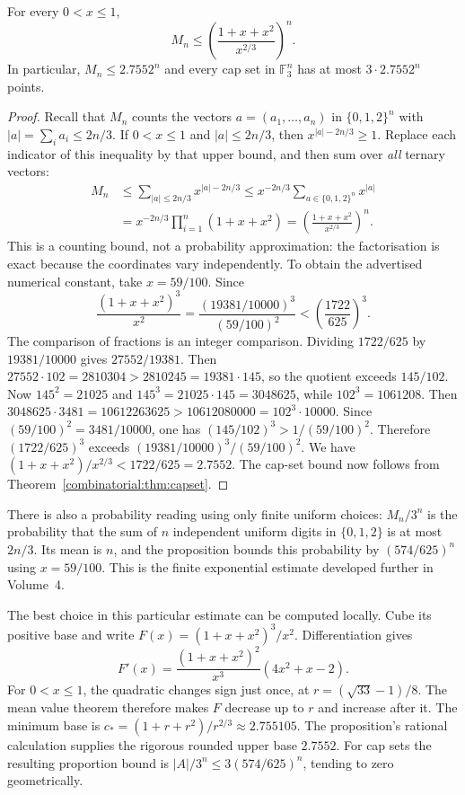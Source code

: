 \begin{proposition}\label{combinatorial:prop:mn}
For every $0<x\le1$,
\[
M_n\le\left(\frac{1+x+x^2}{x^{2/3}}\right)^n.
\]
In particular, $M_n\le 2.7552^n$ and every cap set in
$\mathbb F_3^n$ has at most $3\cdot2.7552^n$ points.
\end{proposition}
\begin{proof}
Recall that $M_n$ counts the vectors $a=(a_1,\ldots,a_n)$
in $\{0,1,2\}^n$ with $|a|=\sum_i a_i\le 2n/3$.
If $0<x\le1$ and $|a|\le2n/3$, then
$x^{|a|-2n/3}\ge1$. Replace each indicator of this
inequality by that upper bound, and then sum over
\emph{all} ternary vectors:
\[
\begin{aligned}
M_n
&\le\sum_{|a|\le2n/3}x^{|a|-2n/3}
 \le x^{-2n/3}\sum_{a\in\{0,1,2\}^n}x^{|a|}\\
&=x^{-2n/3}\prod_{i=1}^n(1+x+x^2)
 =\left(\frac{1+x+x^2}{x^{2/3}}\right)^n.
\end{aligned}
\]
This is a counting bound, not a probability approximation:
the factorisation is exact because the coordinates vary
independently. To obtain the advertised numerical constant,
take $x=59/100$. Since
\[
\frac{(1+x+x^2)^3}{x^2}
=\frac{(19381/10000)^3}{(59/100)^2}
<\left(\frac{1722}{625}\right)^3.
\]
The comparison of fractions is an integer comparison. Dividing $1722/625$ by $19381/10000$ gives $27552/19381$. Then $27552\cdot102=2810304>2810245=19381\cdot145$, so the quotient exceeds $145/102$. Now $145^2=21025$ and $145^3=21025\cdot145=3048625$, while $102^3=1061208$. Then $3048625\cdot3481=10612263625>10612080000=102^3\cdot10000$. Since $(59/100)^2=3481/10000$, one has $(145/102)^3>1/(59/100)^2$. Therefore $(1722/625)^3$ exceeds $(19381/10000)^3/(59/100)^2$.
We have $(1+x+x^2)/x^{2/3}<1722/625=2.7552$.
The cap-set bound now follows from
Theorem~\ref{combinatorial:thm:capset}.
\end{proof}

There is also a probability reading using only finite uniform choices:
$M_n/3^n$ is the probability that the sum of $n$ independent uniform digits
in $\{0,1,2\}$ is at most $2n/3$. Its mean is $n$, and the proposition
bounds this probability by $(574/625)^n$ using $x=59/100$.
This is the finite exponential estimate developed further in Volume~4.

The best choice in this particular estimate can be computed locally.
Cube its positive base and write $F(x)=(1+x+x^2)^3/x^2$. Differentiation gives
\[
F'(x)=\frac{(1+x+x^2)^2}{x^3}(4x^2+x-2).
\]
For $0<x\le1$, the quadratic changes sign just once, at
$r=(\sqrt{33}-1)/8$. The mean value theorem therefore makes $F$ decrease
up to $r$ and increase after it. The minimum base is
$c_*=(1+r+r^2)/r^{2/3}\approx2.755105$.
The proposition's rational calculation supplies the rigorous rounded upper
base $2.7552$.
For cap sets the resulting proportion bound is
$|A|/3^n\le3(574/625)^n$, tending to zero geometrically.

